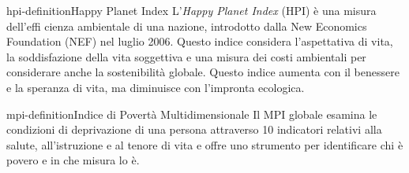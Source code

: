 \documentclass[preview]{standalone}
\begin{document}
\begin{snippetdefinition}{hpi-definition}{Happy Planet Index}
    L'\textit{Happy Planet Index} (HPI) è una misura dell'effi cienza ambientale di una nazione,
    introdotto dalla New Economics Foundation
    (NEF) nel luglio 2006. Questo indice considera l'aspettativa di vita, la soddisfazione
    della vita soggettiva e una misura dei costi ambientali per considerare
    anche la sostenibilità globale.
    Questo indice aumenta con il benessere e la speranza di vita,
    ma diminuisce con l'impronta ecologica.
\end{snippetdefinition}


\begin{snippetdefinition}{mpi-definition}{Indice di Povertà Multidimensionale}
    Il MPI globale esamina le condizioni
    di deprivazione di una persona attraverso 10 indicatori relativi alla salute,
    all'istruzione e al tenore di vita e offre uno strumento per identificare chi è
    povero e in che misura lo è.
\end{snippetdefinition}
\end{document}
